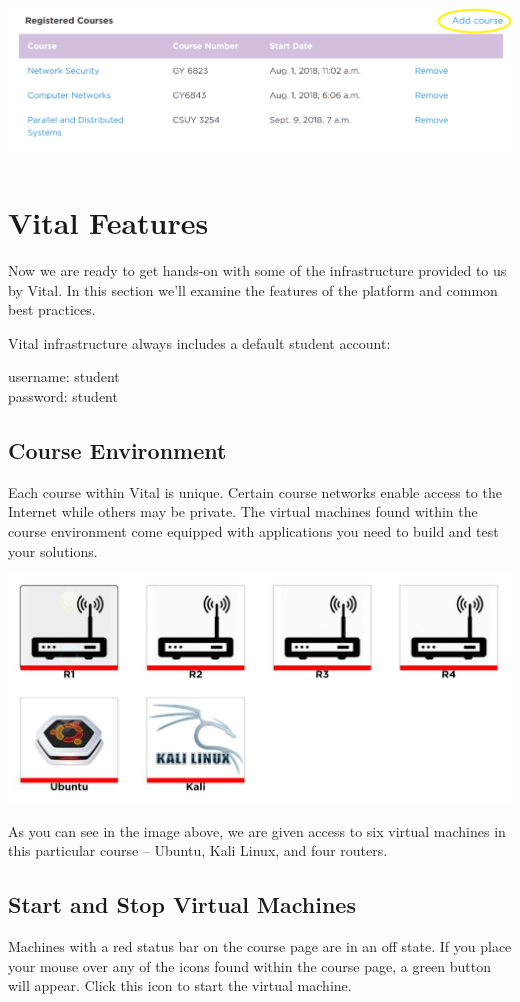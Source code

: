 \documentclass[12pt]{article}
\begin{document}
{%
\centering
\includegraphics[scale=0.50]{course_registration.png}

}

\section*{Vital Features}
Now we are ready to get hands-on with some of the infrastructure provided to us by Vital. In this section we’ll examine the features of the platform and common best practices. 

Vital infrastructure always includes a default student account:

username: student\\
password: student

\subsection*{Course Environment}
Each course within Vital is unique. Certain course networks enable access to the Internet while others may be private. The virtual machines found within the course environment come equipped with applications you need to build and test your solutions.

\includegraphics[scale=0.50]{course_environment}

As you can see in the image above, we are given access to six virtual machines in this particular course – Ubuntu, Kali Linux, and four routers.

\subsection*{Start and Stop Virtual Machines}
Machines with a red status bar on the course page are in an off state. If you place your mouse over any of the icons found within the course page, a green button will appear. 
Click this icon to start the virtual machine.
\end{document}
